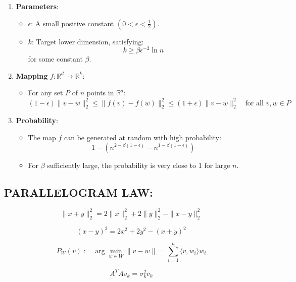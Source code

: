 \documentclass{article}
\begin{document}
\begin{enumerate}
    \item \textbf{Parameters}:
    \begin{itemize}
        \item $\epsilon$: A small positive constant $(0 < \epsilon < \frac{1}{2})$.
        \item $k$: Target lower dimension, satisfying:
        \[
        k \geq \beta \epsilon^{-2} \ln n
        \]
        for some constant $\beta$.
    \end{itemize}
    
    \item \textbf{Mapping} $f: \mathbb{R}^d \rightarrow \mathbb{R}^k$:
    \begin{itemize}
        \item For any set $P$ of $n$ points in $\mathbb{R}^d$:
        \[
        (1 - \epsilon) \|v - w\|^2_2 \leq \|f(v) - f(w)\|^2_2 \leq (1 + \epsilon) \|v - w\|^2_2 \quad \text{for all } v, w \in P
         \]
        \end{itemize}

    \item \textbf{Probability}:
    \begin{itemize}
        \item The map $f$ can be generated at random with high probability:
        \[
        1 - \left( n^{2 - \beta(1 - \epsilon)} - n^{1 - \beta(1 - \epsilon)} \right)
        \]
        \item For $\beta$ sufficiently large, the probability is very close to 1 for large $n$.
    \end{itemize}
\end{enumerate}

\subsection*{PARALLELOGRAM LAW:}
\[
\|x + y\|^2_2 = 2 \|x\|^2_2 + 2 \|y\|^2_2 - \|x - y\|^2_2
\]

\[
(x - y)^2 = 2x^2 + 2y^2 - (x + y)^2
\]

\[
P_W(v) := \arg \min_{w \in W} \|v - w\| = \sum_{i=1}^{n} \langle v, w_i \rangle w_i
\]









\begin{equation}
A^T A v_k = \sigma_k^2 v_k
\end{equation}
\end{document}
